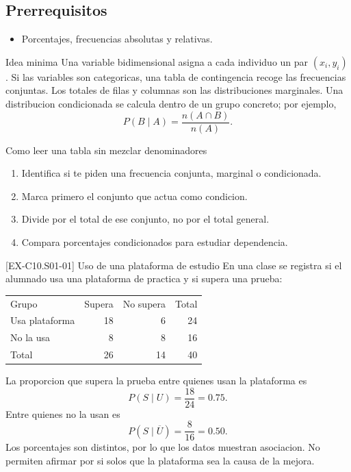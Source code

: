 \subsection*{Prerrequisitos}
\begin{itemize}
  \item Porcentajes, frecuencias absolutas y relativas.
\end{itemize}

\begin{theorybox}{Idea minima}
Una variable bidimensional asigna a cada individuo un par \((x_i,y_i)\). Si las variables son
categoricas, una tabla de contingencia recoge las frecuencias conjuntas. Los totales de filas y
columnas son las distribuciones marginales. Una distribucion condicionada se calcula dentro de
un grupo concreto; por ejemplo,
\[
P(B\mid A)=\frac{n(A\cap B)}{n(A)}.
\]
\end{theorybox}

\begin{methodbox}{Como leer una tabla sin mezclar denominadores}
\begin{enumerate}
  \item Identifica si te piden una frecuencia conjunta, marginal o condicionada.
  \item Marca primero el conjunto que actua como condicion.
  \item Divide por el total de ese conjunto, no por el total general.
  \item Compara porcentajes condicionados para estudiar dependencia.
\end{enumerate}
\end{methodbox}

\begin{solvedexample}{[EX-C10.S01-01] Uso de una plataforma de estudio}
En una clase se registra si el alumnado usa una plataforma de practica y si supera una prueba:
\begin{center}
\begin{tabular}{lrrr}
Grupo & Supera & No supera & Total \\
Usa plataforma & 18 & 6 & 24 \\
No la usa & 8 & 8 & 16 \\
Total & 26 & 14 & 40
\end{tabular}
\end{center}
La proporcion que supera la prueba entre quienes usan la plataforma es
\[
P(S\mid U)=\frac{18}{24}=0.75.
\]
Entre quienes no la usan es
\[
P(S\mid \overline U)=\frac{8}{16}=0.50.
\]
Los porcentajes son distintos, por lo que los datos muestran asociacion. No permiten afirmar por
si solos que la plataforma sea la causa de la mejora.
\end{solvedexample}

